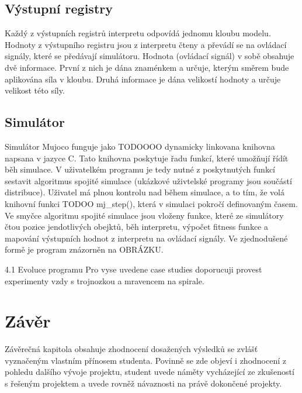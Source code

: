 \section{Výstupní registry}

Každý z výstupních registrů interpretu odpovídá jednomu kloubu modelu.
Hodnoty z výstupního registru jsou z interpretu čteny a převádí se na ovládací signály, které se předávají simulátoru.
Hodnota (ovládací signál) v sobě obsahuje dvě informace.
První z nich je dána znaménkem a určuje, kterým směrem bude aplikována síla v kloubu.
Druhá informace je dána velikostí hodnoty a určuje velikost této síly.

\section{Simulátor}
Simulátor Mujoco funguje jako TODOOOO dynamicky linkovana knihovna napsana v jazyce C.
Tato knihovna poskytuje řadu funkcí, které umožňují řídít běh simulace.
V uživatelkém programu je tedy nutné z poskytnutých funkcí sestavit algoritmus spojité simulace (ukázkové uživtelské programy jsou součástí distribuce).
Uživatel má plnou kontrolu nad během simulace, a to tím, že volá knihovní funkci TODOO mj\_step(), která v simulaci pokročí definovaným časem.
Ve smyčce algoritmu spojité simulace jsou vloženy funkce, které ze simulátory čtou pozice jendotlivých obejktů, běh interpretu, výpočet fitness funkce a mapování výstupních hodnot z interpretu na ovládací signály.
Ve zjednodušené formě je program znázorněn na OBRÁZKU.






4.1 Evoluce programu
Pro vyse uvedene case studies doporucuji provest experimenty vzdy s
trojnozkou a mravencem na spirale.



\chapter{Závěr}
Závěrečná kapitola obsahuje zhodnocení dosažených výsledků se zvlášť vyznačeným vlastním přínosem studenta. Povinně se zde objeví i zhodnocení z pohledu dalšího vývoje projektu, student uvede náměty vycházející ze zkušeností s řešeným projektem a uvede rovněž návaznosti na právě dokončené projekty.

